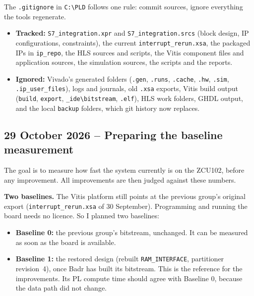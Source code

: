 \documentclass[11pt,a4paper]{article}
\newcommand{\code}[1]{\texttt{#1}}
\begin{document}
The \code{.gitignore} in \code{C:\textbackslash PLD} follows one rule: commit sources, ignore everything the tools regenerate.
\begin{itemize}[noitemsep]
  \item \textbf{Tracked:} \code{S7\_integration.xpr} and \code{S7\_integration.srcs} (block design, IP configurations, constraints), the current \code{interrupt\_rerun.xsa}, the packaged IPs in \code{ip\_repo}, the HLS sources and scripts, the Vitis component files and application sources, the simulation sources, the scripts and the reports.
  \item \textbf{Ignored:} Vivado's generated folders (\code{.gen}, \code{.runs}, \code{.cache}, \code{.hw}, \code{.sim}, \code{.ip\_user\_files}), logs and journals, old \code{.xsa} exports, Vitis build output (\code{build}, \code{export}, \code{\_ide\textbackslash bitstream}, \code{.elf}), HLS work folders, GHDL output, and the local \code{backup} folders, which git history now replaces.
\end{itemize}

\subsection{29 October 2026 -- Preparing the baseline measurement}
The goal is to measure how fast the system currently is on the ZCU102, before any improvement. All improvements are then judged against these numbers.

\textbf{Two baselines.} The Vitis platform still points at the previous group's original export (\code{interrupt\_rerun.xsa} of 30 September). Programming and running the board needs no licence. So I planned two baselines:
\begin{itemize}[noitemsep]
  \item \textbf{Baseline 0:} the previous group's bitstream, unchanged. It can be measured as soon as the board is available.
  \item \textbf{Baseline 1:} the restored design (rebuilt \code{RAM\_INTERFACE}, partitioner revision~4), once Badr has built its bitstream. This is the reference for the improvements. Its PL compute time should agree with Baseline 0, because the data path did not change.
\end{itemize}
\end{document}
